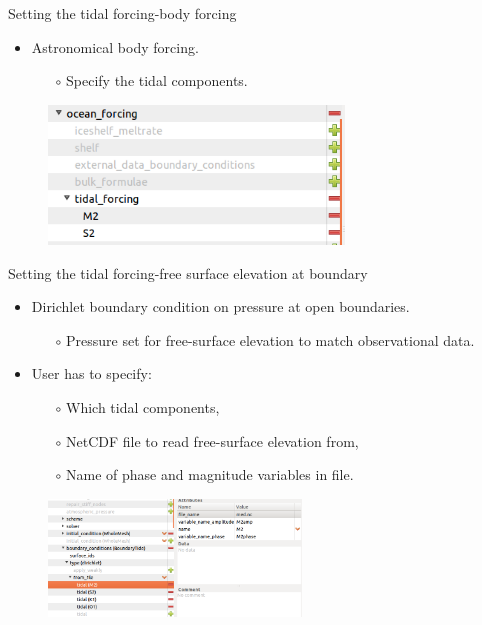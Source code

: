 \begin{frame}{Setting the tidal forcing-body forcing}
  \begin{itemize}
  \item Astronomical body forcing.
    \begin{itemize}
       \item[$\circ$] Specify the tidal components.
    \end{itemize}
  \end{itemize}
  \begin{figure}[htbp!]
    \centering
    \includegraphics[width=0.7\textwidth]{./tides_in_the_Mediterranean_Sea/figures/body_forcing}
  \end{figure}
\end{frame}

\begin{frame}{Setting the tidal forcing-free surface elevation at boundary}
  \begin{itemize}
  \item Dirichlet boundary condition on pressure at open boundaries.
    \begin{itemize}
       \item[$\circ$] Pressure set for free-surface elevation to match observational data.
    \end{itemize}
  \item User has to specify:
    \begin{itemize}
       \item[$\circ$] Which tidal components,
       \item[$\circ$] NetCDF file to read free-surface elevation from,
       \item[$\circ$] Name of phase and magnitude variables in file.
    \end{itemize}
  \end{itemize}
  \begin{figure}[htbp!]
    \centering
    \includegraphics[width=0.6\textwidth]{./tides_in_the_Mediterranean_Sea/figures/diamond_freeSurf_pre_Bc.png}
  \end{figure}
\end{frame}


